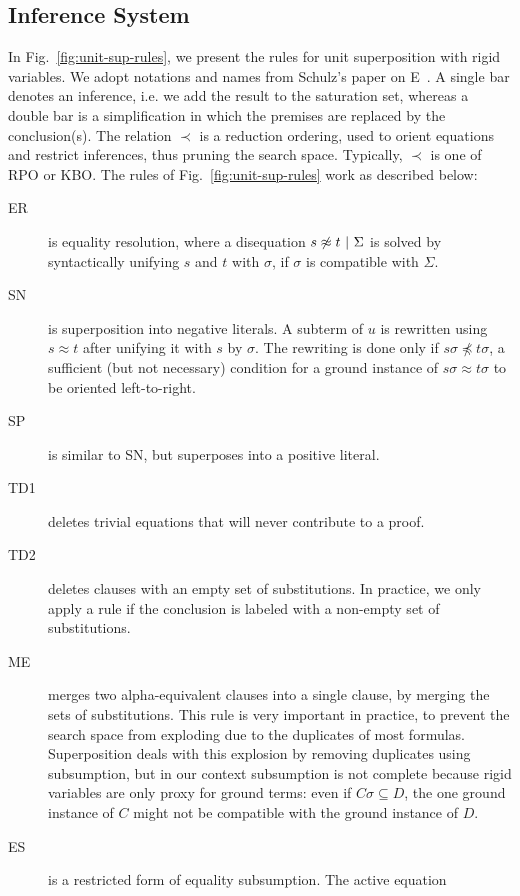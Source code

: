 \subsection{Inference System}

In Fig.~\ref{fig:unit-sup-rules}, we present the rules for unit superposition
with rigid variables. We adopt notations and names from Schulz's paper on
E~\cite{SS02}. A single bar denotes an inference, i.e. we add the result to the
saturation set, whereas a double bar is a simplification in which the premises
are replaced by the conclusion(s). The relation $\prec$ is a reduction ordering,
used to orient equations and restrict inferences, thus pruning the search space.
Typically, $\prec$ is one of RPO or KBO. The rules of
Fig.~\ref{fig:unit-sup-rules} work as described below:

\begin{description}
\item[ER] is equality resolution, where a disequation
$s \not\approx t ~|~ \Sigma$ is solved by syntactically unifying
$s$ and $t$ with $\sigma$, if $\sigma$ is compatible with $\Sigma$.
\item[SN] is superposition into negative literals. A subterm of $u$ is rewritten
using $s \approx t$ after unifying it with $s$ by $\sigma$. The rewriting is
done only if $s\sigma \not\preceq t\sigma$, a sufficient (but not necessary)
condition for a ground instance of $s\sigma \approx t\sigma$ to be oriented
left-to-right.
\item[SP] is similar to SN, but superposes into a positive literal.
\item[TD1] deletes trivial equations that will never contribute to a proof.
\item[TD2] deletes clauses with an empty set of substitutions. In practice, we
only apply a rule if the conclusion is labeled with a non-empty set of
substitutions.
\item[ME] merges two alpha-equivalent clauses into a single clause, by merging
the sets of substitutions. This rule is very important in practice, to prevent
the search space from exploding due to the duplicates of most formulas.
Superposition deals with this explosion by removing duplicates using
subsumption, but in our context subsumption is not complete because rigid
variables are only proxy for ground terms: even if $C\sigma \subseteq D$, the
one ground instance of $C$ might not be compatible with the ground instance of
$D$.
\item[ES] is a restricted form of equality subsumption. The active equation

\end{description}
